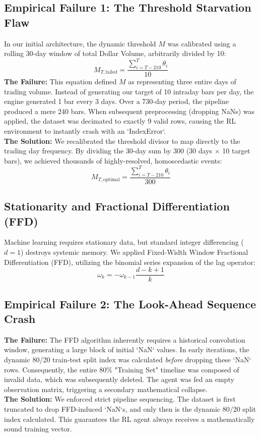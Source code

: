 \documentclass[12pt, a4paper]{article}
\begin{document}
\subsection{Empirical Failure 1: The Threshold Starvation Flaw}
In our initial architecture, the dynamic threshold $M$ was calibrated using a rolling 30-day window of total Dollar Volume, arbitrarily divided by 10:
$$ M_{T, \text{failed}} = \frac{\sum_{i=T-210}^{T} \theta_i}{10} $$
\textbf{The Failure:} This equation defined $M$ as representing three entire days of trading volume. Instead of generating our target of 10 intraday bars per day, the engine generated 1 bar every 3 days. Over a 730-day period, the pipeline produced a mere 240 bars. When subsequent preprocessing (dropping NaNs) was applied, the dataset was decimated to exactly 9 valid rows, causing the RL environment to instantly crash with an `IndexError`.\\
\textbf{The Solution:} We recalibrated the threshold divisor to map directly to the trading day frequency. By dividing the 30-day sum by 300 (30 days $\times$ 10 target bars), we achieved thousands of highly-resolved, homoscedastic events:
$$ M_{T, \text{optimal}} = \frac{\sum_{i=T-210}^{T} \theta_i}{300} $$

\subsection{Stationarity and Fractional Differentiation (FFD)}
Machine learning requires stationary data, but standard integer differencing ($d=1$) destroys systemic memory. We applied Fixed-Width Window Fractional Differentiation (FFD), utilizing the binomial series expansion of the lag operator:
$$ \omega_k = - \omega_{k-1} \frac{d - k + 1}{k} $$

\subsection{Empirical Failure 2: The Look-Ahead Sequence Crash}
\textbf{The Failure:} The FFD algorithm inherently requires a historical convolution window, generating a large block of initial `NaN` values. In early iterations, the dynamic 80/20 train-test split index was calculated \textit{before} dropping these `NaN` rows. Consequently, the entire 80\% "Training Set" timeline was composed of invalid data, which was subsequently deleted. The agent was fed an empty observation matrix, triggering a secondary mathematical collapse.\\
\textbf{The Solution:} We enforced strict pipeline sequencing. The dataset is first truncated to drop FFD-induced `NaN`s, and only then is the dynamic 80/20 split index calculated. This guarantees the RL agent always receives a mathematically sound training vector.
\end{document}
